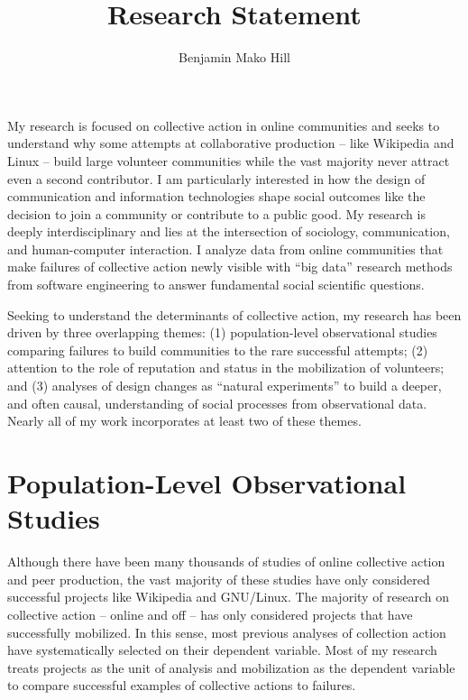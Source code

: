 \documentclass[10pt]{memoir}
\begin{document}
\setlength{\parskip}{4.5pt}

\baselineskip 14.5pt

\title{Research Statement}
\author{Benjamin Mako Hill}

\maketitle

My research is focused on collective action in online communities and
seeks to understand why some attempts at collaborative production --
like Wikipedia and Linux -- build large volunteer communities while
the vast majority never attract even a second contributor. I am
particularly interested in how the design of communication and
information technologies shape social outcomes like the decision to
join a community or contribute to a public good. My research is deeply
interdisciplinary and lies at the intersection of sociology,
communication, and human-computer interaction. I analyze data from
online communities that make failures of collective action newly
visible with ``big data'' research methods from software engineering
to answer fundamental social scientific questions.

Seeking to understand the determinants of collective action, my
research has been driven by three overlapping themes: (1)
population-level observational studies comparing failures to build
communities to the rare successful attempts; (2) attention to the role
of reputation and status in the mobilization of volunteers; and (3)
analyses of design changes as ``natural experiments'' to build a
deeper, and often causal, understanding of social processes from
observational data. Nearly all of my work incorporates at least two of
these themes.

\section{Population-Level Observational Studies}

Although there have been many thousands of studies of online
collective action and peer production, the vast majority of these
studies have only considered successful projects like Wikipedia and
GNU/Linux.  The majority of research on collective action -- online
and off -- has only considered projects that have successfully
mobilized. In this sense, most previous analyses of
collection action have systematically selected on their dependent
variable. Most of my research treats projects as the unit of analysis
and mobilization as the dependent variable to compare successful
examples of collective actions to failures.
\end{document}
